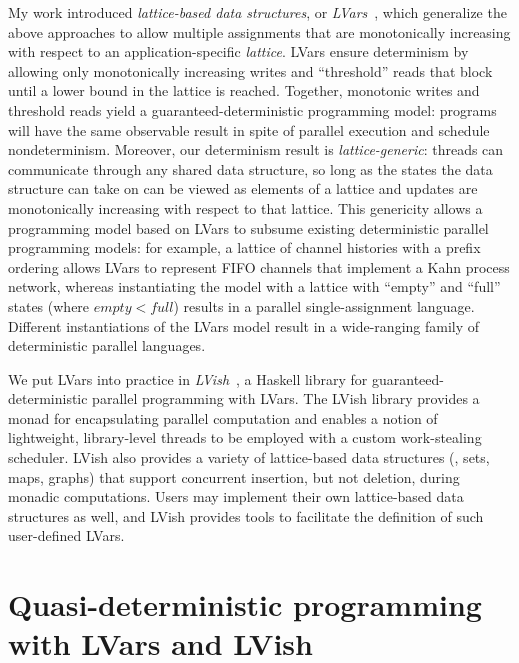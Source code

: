 \documentclass[10pt, letterpaper]{article}
\begin{document}

My work introduced \emph{lattice-based data structures}, or
\emph{LVars}~\cite{LVars-paper, LVars-TR}, which generalize the above
approaches to allow multiple assignments that are monotonically
increasing with respect to an application-specific \emph{lattice}.
LVars ensure determinism by allowing only monotonically increasing
writes and ``threshold'' reads that block until a lower bound in the
lattice is reached.  Together, monotonic writes and threshold reads
yield a guaranteed-deterministic programming model: programs will have
the same observable result in spite of parallel execution and schedule
nondeterminism.  Moreover, our determinism result is
\emph{lattice-generic}: threads can communicate through any shared
data structure, so long as the states the data structure can take on
can be viewed as elements of a lattice and updates are monotonically
increasing with respect to that lattice.  This genericity allows a
programming model based on LVars to subsume existing deterministic
parallel programming models: for example, a lattice of channel
histories with a prefix ordering allows LVars to represent FIFO
channels that implement a Kahn process network, whereas instantiating
the model with a lattice with ``empty'' and ``full'' states (where
$\mathit{empty} < \mathit{full}$) results in a parallel
single-assignment language.  Different instantiations of the LVars
model result in a wide-ranging family of deterministic parallel
languages.

We put LVars into practice in \emph{LVish}~\cite{LVish}, a Haskell
library for guaranteed-deterministic parallel programming with LVars.
The LVish library provides a monad for encapsulating parallel
computation and enables a notion of lightweight, library-level threads
to be employed with a custom work-stealing scheduler.  LVish also
provides a variety of lattice-based data structures (\eg, sets, maps,
graphs) that support concurrent insertion, but not deletion, during
monadic computations.  Users may implement their own lattice-based
data structures as well, and LVish provides tools to facilitate the
definition of such user-defined LVars.

\section{Quasi-deterministic programming with LVars and LVish}\label{quasi}
\end{document}
